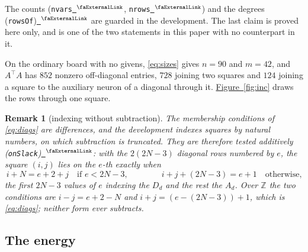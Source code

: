 \documentclass{easychair}
\newtheorem{remark}[thm]{Remark}
\newcommand{\figref}[1]{\textcolor{academicpurple}{\hyperref[#1]{Figure~\ref*{#1}}}}
\newcommand{\extlink}{~\ensuremath{{}^\text{\faExternalLink}}}
\newcommand{\repoowner}{mkaratarakis/HNBM}
\newcommand{\reporef}{1bd91612ee31180f6c99fa11090b713f3012ead4}
\newcommand{\repo}{https://github.com/\repoowner/blob/\reporef}
\newcommand{\srcl}[2]{\href{\repo/#1\#L#2}{\extlink}}
\newcommand{\qsrc}[2]{\srcl{HopfieldNet/QUBO/Instances/Queens/#1}{#2}}
\begin{document}
\noindent The counts (\lstinline{nvars}\qsrc{Basic.lean}{148}, \lstinline{nrows}\qsrc{Basic.lean}{155})
and the degrees
(\lstinline{rowsOf})\qsrc{Basic.lean}{320} are guarded in the development. The last claim is proved
here only, and is one of the two statements in this paper with no counterpart in it.

On the ordinary board with no givens, \eqref{eq:sizes} gives $n = 90$ and $m = 42$, and
$A^{\top}\!A$ has $852$ nonzero off-diagonal entries, $728$ joining two squares and $124$
joining a square to the auxiliary neuron of a diagonal through it. \figref{fig:inc} draws the rows
through one square.

\begin{remark}[indexing without subtraction]\label{rem:onslack}
The membership conditions of \eqref{eq:diags} are differences, and the development indexes squares by
natural numbers, on which subtraction is truncated. They are therefore tested additively
(\lstinline{onSlack})\qsrc{Basic.lean}{193}: with the $2(2N-3)$ diagonal rows numbered by $e$, the
square $(i,j)$ lies on the $e$-th exactly when
\begin{equation}\label{eq:onslack}
  i + N = e + 2 + j \quad\text{if } e < 2N-3, \qquad\qquad
  i + j + (2N-3) = e + 1 \quad\text{otherwise,}
\end{equation}
the first $2N-3$ values of $e$ indexing the $D_d$ and the rest the $A_d$. Over $\mathbb{Z}$ the two
conditions are $i - j = e + 2 - N$ and $i + j = (e - (2N-3)) + 1$, which is \eqref{eq:diags}; neither
form ever subtracts.
\end{remark}

\subsection*{The energy}
\end{document}
